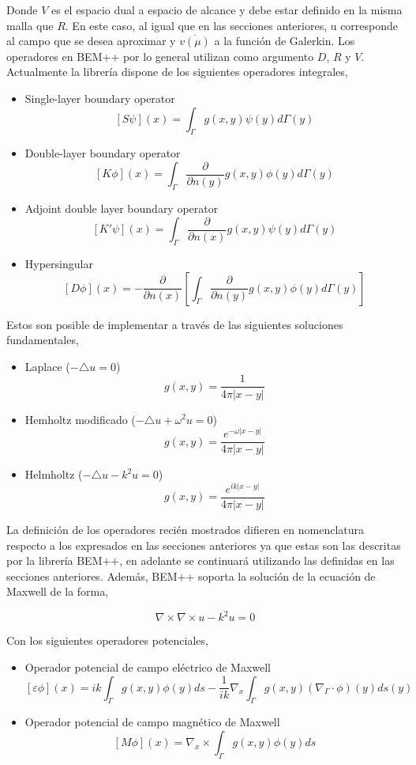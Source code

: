 \documentclass[12pt,letterpaper]{article}
\numberwithin{equation}{section}
\begin{document}
Donde $V$ es el espacio dual a espacio de alcance y debe estar definido en la misma malla que $R$. En este caso, al igual que en las secciones anteriores, u corresponde al campo que se desea aproximar y $\overline{v(\mu)}$ a la función de Galerkin. Los operadores en BEM++ por lo general utilizan como argumento $D$, $R$ y $V$. Actualmente la librería dispone de los siguientes operadores integrales,

\begin{itemize}
	\item Single-layer boundary operator 
	$$[S\psi](x)=\int_{\Gamma}g(x,y)\psi(y) d\varGamma(y)$$
	\item Double-layer boundary operator $$[K\phi](x)=\int_{\Gamma}\frac{\partial}{\partial n(y)} g(x,y)\phi(y) d\varGamma(y)$$
	\item Adjoint double layer boundary operator
	$$[K'\psi](x)=\int_{\Gamma}\frac{\partial}{\partial n(x)}g(x,y)\psi(y) d\varGamma(y)$$
	\item Hypersingular
	$$[D\phi](x)=-\frac{\partial}{\partial n(x)}\left[ \int_{\Gamma}\frac{\partial}{\partial n(y)} g(x,y)\phi(y) d\varGamma(y)\right]$$
\end{itemize}

Estos son posible de implementar a través de las siguientes soluciones fundamentales,

\begin{itemize}
	\item Laplace ($-\triangle u=0$)
	$$g(x,y)=\frac{1}{4\pi |x-y|}$$
	\item Hemholtz modificado ($-\triangle u+\omega^2u=0$)
	$$g(x,y)=\frac{e^{-\omega|x-y|}}{4\pi |x-y|}$$
	\item Helmholtz ($-\triangle u-k^2u=0$)
	$$g(x,y)=\frac{e^{ik|x-y|}}{4\pi |x-y|}$$
\end{itemize}

La definición de los operadores recién mostrados difieren en nomenclatura respecto a los expresados en las secciones anteriores ya que estas son las descritas por la librería BEM++, en adelante se continuará utilizando las definidas en las secciones anteriores. Además, BEM++ soporta la solución de la ecuación de Maxwell de la forma,

$$\nabla\times\nabla\times u-k^2u=0$$

Con los siguientes operadores potenciales,
\begin{itemize}
	\item Operador potencial de campo eléctrico de Maxwell 
	$$\left[\varepsilon\phi \right](x)=ik\int_{\Gamma}g(x,y)\phi(y)ds-\frac{1}{ik}\nabla_x\int_{\Gamma}g(x,y)(\nabla_\Gamma\cdotp\phi)(y)ds(y)$$
	\item Operador potencial de campo magnético de Maxwell
	$$\left[M\phi \right](x)=\nabla_x\times\int_{\Gamma}g(x,y)\phi(y)ds$$
\end{itemize}
\end{document}
